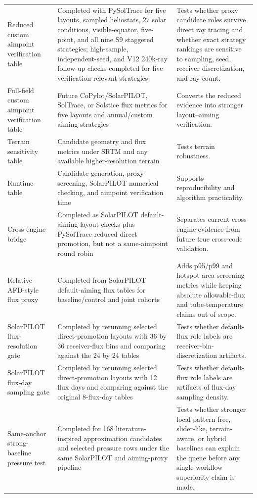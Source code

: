 \documentclass[final,3p,times]{elsarticle}
\begin{document}
\begin{longtable}{p{}p{}p{}}
Reduced custom aimpoint verification table & Completed with PySolTrace for five layouts, sampled heliostats, 27 solar conditions, visible-equator, five-point, and all nine S9 staggered strategies; high-sample, independent-seed, and V12 240k-ray follow-up checks completed for five verification-relevant strategies & Tests whether proxy candidate roles survive direct ray tracing and whether exact strategy rankings are sensitive to sampling, seed, receiver discretization, and ray count. \\
Full-field custom aimpoint verification table & Future CoPylot/SolarPILOT, SolTrace, or Solstice flux metrics for five layouts and annual/custom aiming strategies & Converts the reduced evidence into stronger layout--aiming verification. \\
Terrain sensitivity table & Candidate geometry and flux metrics under SRTM and any available higher-resolution terrain & Tests terrain robustness. \\
Runtime table & Candidate generation, proxy screening, SolarPILOT numerical checking, and aimpoint verification time & Supports reproducibility and algorithm practicality. \\
Cross-engine bridge & Completed as SolarPILOT default-aiming layout checks plus PySolTrace reduced direct promotion, but not a same-aimpoint round robin & Separates current cross-engine evidence from future true cross-code validation. \\
Relative AFD-style flux proxy & Completed from SolarPILOT default-aiming flux tables for baseline/control and joint cohorts & Adds p95/p99 and hotspot-area screening metrics while keeping absolute allowable-flux and tube-temperature claims out of scope. \\
SolarPILOT flux-resolution gate & Completed by rerunning selected direct-promotion layouts with 36 by 36 receiver-flux bins and comparing against the 24 by 24 tables & Tests whether default-flux role labels are receiver-bin-discretization artifacts. \\
SolarPILOT flux-day sampling gate & Completed by rerunning selected direct-promotion layouts with 12 flux days and comparing against the original 8-flux-day tables & Tests whether default-flux role labels are artifacts of flux-day sampling density. \\
Same-anchor strong-baseline pressure test & Completed for 168 literature-inspired approximation candidates and selected pressure rows under the same SolarPILOT and aiming-proxy pipeline & Tests whether stronger local pattern-free, slider-like, terrain-aware, or hybrid baselines can explain the queue before any single-workflow superiority claim is made. \\

\end{longtable}
\end{document}
